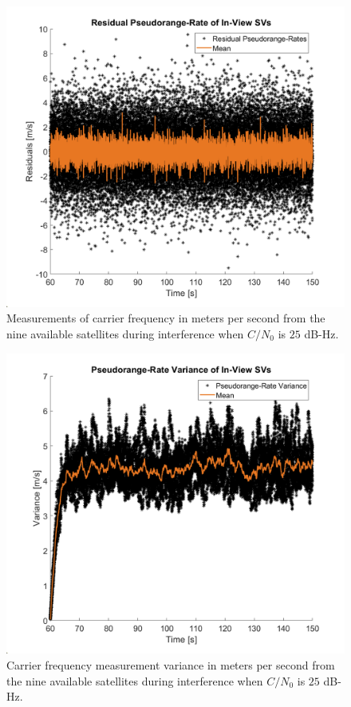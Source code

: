 \documentclass[12pt]{report}
\begin{document}
\begin{figure}[!ht]
  \centering
  \includegraphics[width=0.75\linewidth]{Figures/Results/Scenario1/Case25/carrierFreq.png}
  \caption{Measurements of carrier frequency in meters per second from the nine available satellites during interference when \(C/N_0\) is \(25\) dB-Hz.}\label{fig:carrier25}
\end{figure}

\begin{figure}[!ht]
  \centering
  \includegraphics[width=0.75\linewidth]{Figures/Results/Scenario1/Case25/carrierVariance.png}
  \caption{Carrier frequency measurement variance in meters per second from the nine available satellites during interference when \(C/N_0\) is \(25\) dB-Hz.}\label{fig:carrierVariance25}
\end{figure}
\end{document}
